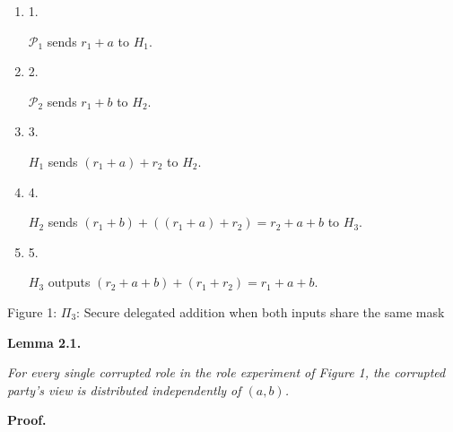 \documentclass[10pt,a4paper]{article}
\begin{document}
\begin{enumerate}


\item[] 
1. 


$\mathcal{P}_{1}$ sends $r_{1}+a$ to $H_{1}$.\par





\item[] 
2. 


$\mathcal{P}_{2}$ sends $r_{1}+b$ to $H_{2}$.\par





\item[] 
3. 


$H_{1}$ sends $(r_{1}+a)+r_{2}$ to $H_{2}$.\par





\item[] 
4. 


$H_{2}$ sends $(r_{1}+b)+((r_{1}+a)+r_{2})=r_{2}+a+b$ to $H_{3}$.\par





\item[] 
5. 


$H_{3}$ outputs $(r_{2}+a+b)+(r_{1}+r_{2})=r_{1}+a+b$.\par





\end{enumerate}


Figure 1: $\Pi_{3}$: Secure delegated addition when both inputs share the same mask




\par\medskip\noindent\textbf{
\textbf{Lemma 2.1}\textbf{.}
}\par



\emph{For every single corrupted role in the role experiment of Figure 1, the corrupted party’s view is distributed independently of $(a,b)$.}\par






\par\medskip\noindent\textbf{Proof.}\par
\end{document}
